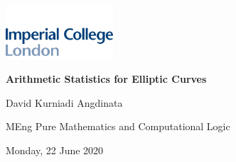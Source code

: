 \documentclass[10pt]{beamer}
\begin{document}
\begin{frame}

\begin{center}

\includegraphics[width=0.3\textwidth]{imperial.png}

\vspace{1cm}

\textbf{\Large Arithmetic Statistics for Elliptic Curves}

\vspace{1cm}

{\normalsize David Kurniadi Angdinata}

{\scriptsize MEng Pure Mathematics and Computational Logic}

{\tiny Monday, 22 June 2020}

\end{center}

\end{frame}
\end{document}
